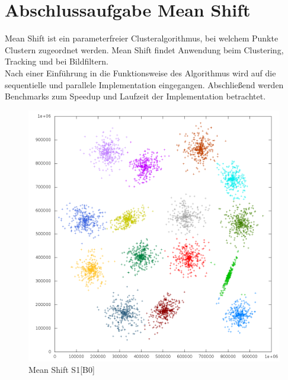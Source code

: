 \chapter{Abschlussaufgabe Mean Shift}
Mean Shift ist ein parameterfreier Clusteralgorithmus, bei welchem Punkte Clustern zugeordnet werden. Mean Shift findet Anwendung beim Clustering,
Tracking und bei Bildfiltern.\\
Nach einer Einführung in die Funktionsweise des Algorithmus wird auf die sequentielle und parallele Implementation eingegangen.
Abschließend werden Benchmarks zum Speedup und Laufzeit der Implementation betrachtet.\\
\vspace{-10pt}
\begin{figure}[H]
	\centering
	\includegraphics[scale=0.61]{../meanshift/output/pics/s1_colored.png} 
	\vspace{-10pt}
	\caption{Mean Shift S1[B0]}
\end{figure}
